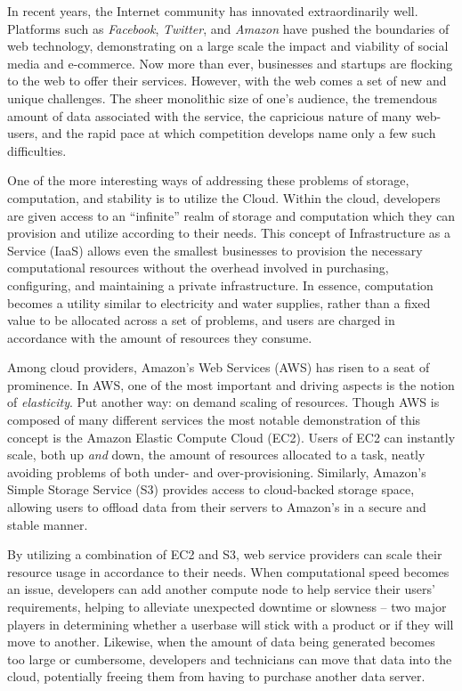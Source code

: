 In recent years, the Internet community has innovated extraordinarily well.
Platforms such as \emph{Facebook}, \emph{Twitter}, and \emph{Amazon} have
pushed the boundaries of web technology, demonstrating on a large scale the
impact and viability of social media and e-commerce. Now more than ever,
businesses and startups are flocking to the web to offer their services.
However, with the web comes a set of new and unique challenges. The sheer
monolithic size of one's audience, the tremendous amount of data associated
with the service, the capricious nature of many web-users, and the rapid pace
at which competition develops name only a few such difficulties.

One of the more interesting ways of addressing these problems of storage,
computation, and stability is to utilize the Cloud. Within the cloud,
developers are given access to an ``infinite'' realm of storage and computation
which they can provision and utilize according to their needs. This concept of
Infrastructure as a Service (IaaS) allows even the smallest businesses to
provision the necessary computational resources without the overhead involved
in purchasing, configuring, and maintaining a private infrastructure. In
essence, computation becomes a utility similar to electricity and water
supplies, rather than a fixed value to be allocated across a set of problems,
and users are charged in accordance with the amount of resources they consume.

Among cloud providers, Amazon's Web Services (AWS) has risen to a seat of
prominence. In AWS, one of the most important and driving aspects is the notion
of \emph{elasticity}. Put another way: on demand scaling of resources. Though
AWS is composed of many different services the most notable demonstration of
this concept is the Amazon Elastic Compute Cloud (EC2). Users of EC2 can
instantly scale, both up \emph{and} down, the amount of resources allocated to
a task, neatly avoiding problems of both under- and over-provisioning.
Similarly, Amazon's Simple Storage Service (S3) provides access to cloud-backed
storage space, allowing users to offload data from their servers to Amazon's in
a secure and stable manner.

By utilizing a combination of EC2 and S3, web service providers can scale their
resource usage in accordance to their needs. When computational speed becomes
an issue, developers can add another compute node to help service their users'
requirements, helping to alleviate unexpected downtime or slowness -- two major
players in determining whether a userbase will stick with a product or if they
will move to another. Likewise, when the amount of data being generated becomes
too large or cumbersome, developers and technicians can move that data into the
cloud, potentially freeing them from having to purchase another data server.


